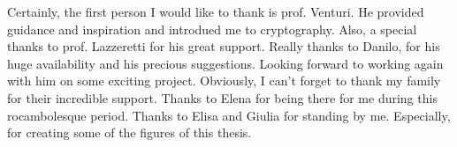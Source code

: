 \begin{acknowledgments}
    Certainly, the first person I would like to thank is prof. Venturi.
    \newline
    He provided guidance and inspiration and introdued me to cryptography.
    \newline\newline
    Also, a special thanks to prof. Lazzeretti for his great support.
    \newline\newline
    Really thanks to Danilo, for his huge availability and his precious suggestions.
    \newline
    Looking forward to working again with him on some exciting project.
    \newline\newline
    Obviously, I can't forget to thank my family for their incredible support.
    \newline\newline
    Thanks to Elena for being there for me during this rocambolesque period.
    \newline\newline
    Thanks to Elisa and Giulia for standing by me.
    \newline
    Especially, for creating some of the figures of this thesis.
\end{acknowledgments}